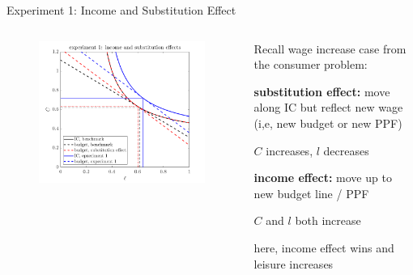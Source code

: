 \documentclass[11pt,aspectratio=169,usenames,dvipsnames]{beamer}
\let\tempone\itemize
\let\temptwo\enditemize
\renewenvironment{itemize}{\tempone\addtolength{\itemsep}{\fill}}{\temptwo}
\begin{document}
\begin{frame}{Experiment 1: Income and Substitution Effect}
\label{slide:Experiment_1__Income_and_Substitution_Effect}
    \begin{columns}
        \begin{column}{0.5\textwidth}
            \begin{figure}
                \includegraphics[width=\textwidth]{./figures/IncomeSubEffect.png}
            \end{figure}
        \end{column}
        \begin{column}{0.5\textwidth}
            Recall wage increase case from the consumer problem:
            \begin{itemize}
                \item \textbf{substitution effect:} move along IC but reflect new wage (i,e, new budget or new PPF)
                \begin{itemize}
                    \item $ C $ increases, $ l $ decreases
                \end{itemize}
                \item \textbf{income effect:} move up to new budget line / PPF
                \begin{itemize}
                    \item $ C $ and $ l $ both increase
                \end{itemize}
                \item here, income effect wins and leisure increases
            \end{itemize}
        \end{column}
    \end{columns}
\end{frame}
\end{document}
